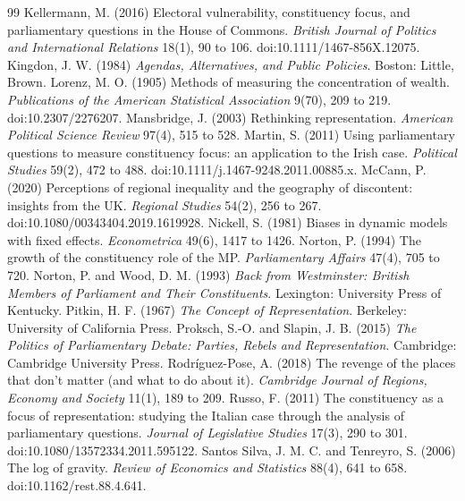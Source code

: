 \documentclass[11pt,a4paper]{article}
\begin{document}
\begin{thebibliography}{99}
 Kellermann, M. (2016) Electoral vulnerability, constituency focus, and parliamentary questions in the House of Commons. \textit{British Journal of Politics and International Relations} 18(1), 90 to 106. doi:10.1111/1467-856X.12075.
 Kingdon, J. W. (1984) \textit{Agendas, Alternatives, and Public Policies}. Boston: Little, Brown.
 Lorenz, M. O. (1905) Methods of measuring the concentration of wealth. \textit{Publications of the American Statistical Association} 9(70), 209 to 219. doi:10.2307/2276207.
 Mansbridge, J. (2003) Rethinking representation. \textit{American Political Science Review} 97(4), 515 to 528.
 Martin, S. (2011) Using parliamentary questions to measure constituency focus: an application to the Irish case. \textit{Political Studies} 59(2), 472 to 488. doi:10.1111/j.1467-9248.2011.00885.x.
 McCann, P. (2020) Perceptions of regional inequality and the geography of discontent: insights from the UK. \textit{Regional Studies} 54(2), 256 to 267. doi:10.1080/00343404.2019.1619928.
 Nickell, S. (1981) Biases in dynamic models with fixed effects. \textit{Econometrica} 49(6), 1417 to 1426.
 Norton, P. (1994) The growth of the constituency role of the MP. \textit{Parliamentary Affairs} 47(4), 705 to 720.
 Norton, P. and Wood, D. M. (1993) \textit{Back from Westminster: British Members of Parliament and Their Constituents}. Lexington: University Press of Kentucky.
 Pitkin, H. F. (1967) \textit{The Concept of Representation}. Berkeley: University of California Press.
 Proksch, S.-O. and Slapin, J. B. (2015) \textit{The Politics of Parliamentary Debate: Parties, Rebels and Representation}. Cambridge: Cambridge University Press.
 Rodr\'iguez-Pose, A. (2018) The revenge of the places that don't matter (and what to do about it). \textit{Cambridge Journal of Regions, Economy and Society} 11(1), 189 to 209.
 Russo, F. (2011) The constituency as a focus of representation: studying the Italian case through the analysis of parliamentary questions. \textit{Journal of Legislative Studies} 17(3), 290 to 301. doi:10.1080/13572334.2011.595122.
 Santos Silva, J. M. C. and Tenreyro, S. (2006) The log of gravity. \textit{Review of Economics and Statistics} 88(4), 641 to 658. doi:10.1162/rest.88.4.641.

\end{thebibliography}
\end{document}
